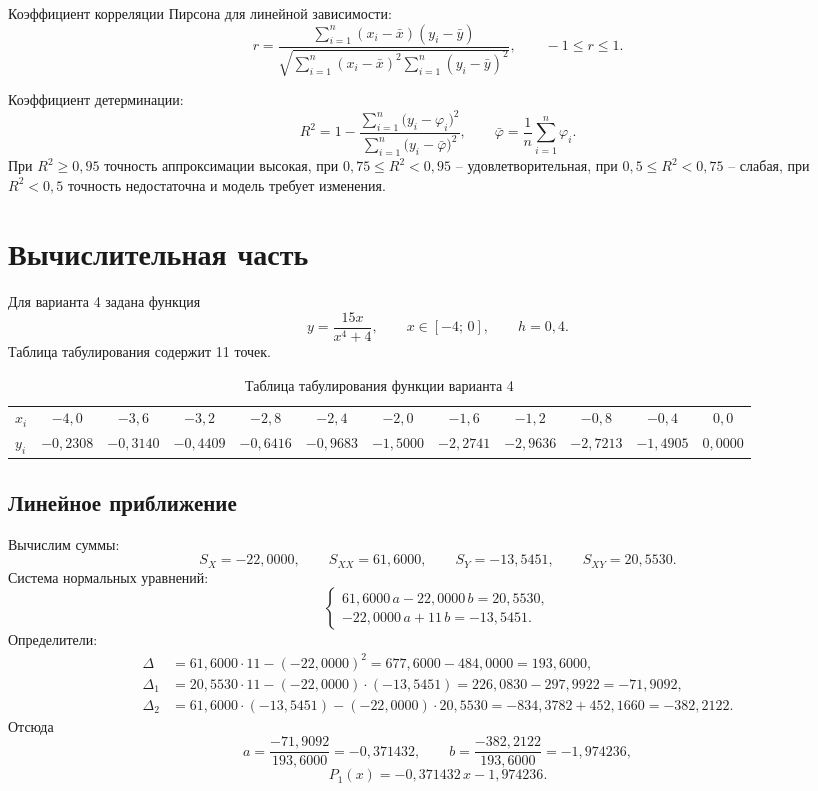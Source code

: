 \documentclass[12pt,a4paper]{article}
\begin{document}
Коэффициент корреляции Пирсона для линейной зависимости:
\[
    r=\frac{\sum_{i=1}^{n}(x_i-\bar x)(y_i-\bar y)}
    {\sqrt{\sum_{i=1}^{n}(x_i-\bar x)^2\sum_{i=1}^{n}(y_i-\bar y)^2}},\qquad -1\le r\le 1 .
\]

Коэффициент детерминации:
\[
    R^2=1-\frac{\sum_{i=1}^{n}\bigl(y_i-\varphi_i\bigr)^2}{\sum_{i=1}^{n}\bigl(y_i-\bar\varphi\bigr)^2},
    \qquad \bar\varphi=\frac1n\sum_{i=1}^{n}\varphi_i .
\]
При $R^2\ge0{,}95$ точность аппроксимации высокая, при $0{,}75\le R^2<0{,}95$ -- удовлетворительная, при $0{,}5\le R^2<0{,}75$ -- слабая, при $R^2<0{,}5$ точность недостаточна и модель требует изменения.

\section*{Вычислительная часть}
Для варианта 4 задана функция
\[
    y=\frac{15x}{x^4+4},\qquad x\in[-4;\,0],\qquad h=0{,}4 .
\]
Таблица табулирования содержит 11 точек.

\begin{table}[H]
    \centering
    \footnotesize
    \setlength{\tabcolsep}{3pt}
    \caption{Таблица табулирования функции варианта 4}
    \begin{tabular}{l*{11}{c}}
        \toprule
        $x_i$ & $-4{,}0$ & $-3{,}6$ & $-3{,}2$ & $-2{,}8$ & $-2{,}4$ & $-2{,}0$ & $-1{,}6$ & $-1{,}2$ & $-0{,}8$ & $-0{,}4$ & $0{,}0$\\
        $y_i$ & $-0{,}2308$ & $-0{,}3140$ & $-0{,}4409$ & $-0{,}6416$ & $-0{,}9683$ & $-1{,}5000$ & $-2{,}2741$ & $-2{,}9636$ & $-2{,}7213$ & $-1{,}4905$ & $0{,}0000$\\
        \bottomrule
    \end{tabular}
\end{table}

\subsection*{Линейное приближение}
Вычислим суммы:
\[
    S_X=-22{,}0000,\qquad S_{XX}=61{,}6000,\qquad S_Y=-13{,}5451,\qquad S_{XY}=20{,}5530 .
\]
Система нормальных уравнений:
\[
    \begin{cases}
        61{,}6000\,a-22{,}0000\,b=20{,}5530,\\
        -22{,}0000\,a+11\,b=-13{,}5451 .
    \end{cases}
\]
Определители:
\[
\begin{aligned}
    \Delta &= 61{,}6000\cdot 11-(-22{,}0000)^2=677{,}6000-484{,}0000=193{,}6000,\\
    \Delta_1 &= 20{,}5530\cdot 11-(-22{,}0000)\cdot(-13{,}5451)=226{,}0830-297{,}9922=-71{,}9092,\\
    \Delta_2 &= 61{,}6000\cdot(-13{,}5451)-(-22{,}0000)\cdot 20{,}5530=-834{,}3782+452{,}1660=-382{,}2122 .
\end{aligned}
\]
Отсюда
\[
    a=\frac{-71{,}9092}{193{,}6000}=-0{,}371432,\qquad
    b=\frac{-382{,}2122}{193{,}6000}=-1{,}974236,
\]
\[
    P_1(x)=-0{,}371432\,x-1{,}974236 .
\]
\end{document}
